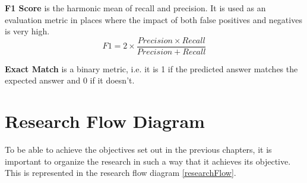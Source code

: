 \documentclass[a4paper,12pt]{report}
\begin{document}
	\textbf{F1 Score } is the harmonic mean of recall and precision. It is used as an evaluation metric in places where the impact of both false positives and negatives is very high.
		\begin{equation}\label{f1}
		F1 = 2 \times \dfrac{Precision \times Recall}{Precision + Recall}
	\end{equation}

	\textbf{Exact Match} is a binary metric, i.e. it is 1 if the predicted answer matches the expected answer and 0 if it doesn't.

	\section{Research Flow Diagram}\label{c34}
	 To be able to achieve the objectives set out in the previous chapters, it is important to organize the research in such a way that it achieves its objective. This is represented in the research flow diagram \ref{researchFlow}.
\end{document}
